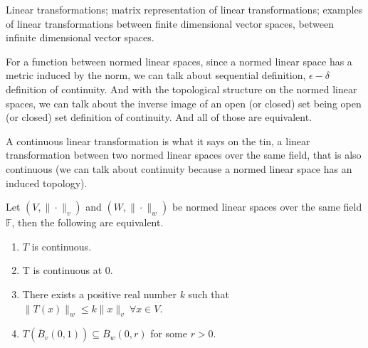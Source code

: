 \vspace{0.4cm}
\begin{recall}
    Linear transformations; matrix representation of linear transformations; examples of linear transformations between finite dimensional vector spaces, between infinite dimensional vector spaces.
\end{recall}
\vspace{0.4cm}
\begin{note}
    For a function between normed linear spaces, since a normed linear space has a metric induced by the norm, we can talk about sequential definition, $\epsilon-\delta$ definition of continuity. And with the topological structure on the normed linear spaces, we can talk about the inverse image of an open (or closed) set being open (or closed) set definition of continuity. And all of those are equivalent.
\end{note}
\vspace{0.4cm}
\begin{definition}
    A continuous linear transformation is what it says on the tin, a linear transformation between two normed linear spaces over the same field, that is also continuous (we can talk about continuity because a normed linear space has an induced topology).\\
\end{definition}
\vspace{0.4cm}
\begin{prop}
    Let $(V,\|\cdot\|_{v})$ and $(W,\|\cdot\|_{w})$ be normed linear spaces over the same field $\mathbb{F}$, then the following are equivalent.
    \begin{enumerate}[label=\roman*.]
        \item $T$ is continuous.
        \item T is continuous at $0$.
        \item There exists a positive real number $k$ such that $\|T(x)\|_{w}\leq k\|x\|_{v}~\forall x\in V$.
        \item $T\left(\overline{B}_{v}(0,1)\right)\subseteq\overline{B}_{w}(0,r)$ for some $r>0$.
    \end{enumerate}
\end{prop}
